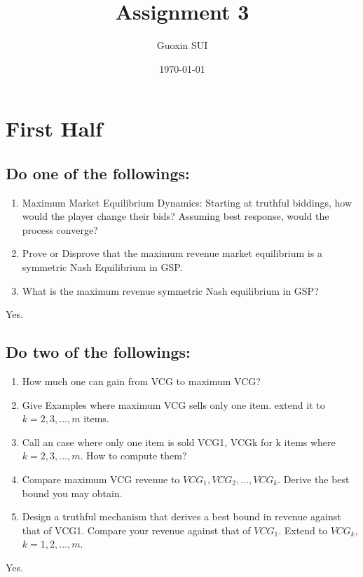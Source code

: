 \documentclass{article}
\title{Assignment 3}
\author{Guoxin SUI}
\date{\today}
\newenvironment{answer}{\par\color{ForestGreen}}{\par}
\begin{document}
\maketitle

\section{First Half}
\subsection{Do one of the followings:}
\begin{enumerate}
    \item
    Maximum Market Equilibrium Dynamics: Starting at truthful biddings,
    how would the player change their bids? Assuming best response, would the process converge?
    \item
    Prove or Disprove that the maximum revenue market equilibrium is a symmetric Nash Equilibrium in GSP.
    \item
    What is the maximum revenue symmetric Nash equilibrium in GSP?
\end{enumerate}

\begin{answer}
  Yes.
\end{answer}

\subsection{Do two of the followings:}
\begin{enumerate}
    \item
    How much one can gain from VCG to maximum VCG?
    \item
    Give Examples where maximum VCG sells only one item. extend it to $k = 2,3,... ,m$ items.
    \item
    Call an case where only one item is sold VCG1, VCGk for k items where $k = 2,3,... ,m.$ How to compute them?
    \item
    Compare maximum VCG revenue to $VCG_1, VCG_2,... ,VCG_k$. Derive the best bound you may obtain.
    \item
    Design a truthful mechanism that derives a best bound in revenue against that of VCG1.
    Compare your revenue against that of $VCG_1$. Extend to $VCG_k$, $k = 1,2,... ,m$.
\end{enumerate}

\begin{answer}
  Yes.
\end{answer}
\end{document}
